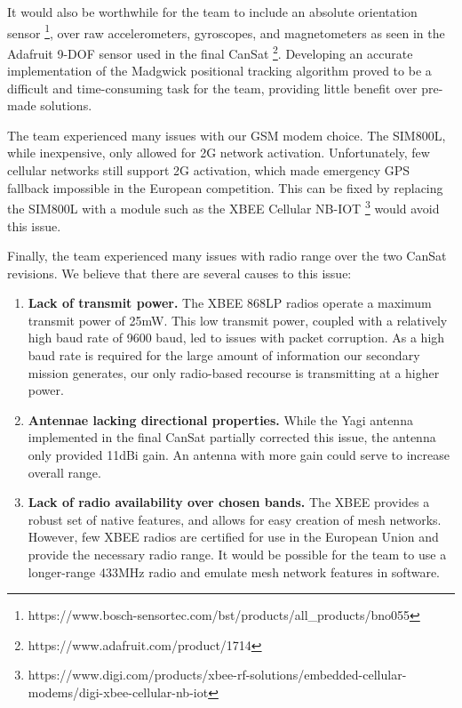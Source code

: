 \documentclass[]{report}
\begin{document}
	It would also be worthwhile for the team to include an absolute orientation sensor \footnote{https://www.bosch-sensortec.com/bst/products/all\_products/bno055}, over raw accelerometers, gyroscopes, and magnetometers as seen in the Adafruit 9-DOF sensor used in the final CanSat \footnote{https://www.adafruit.com/product/1714}. Developing an accurate implementation of the Madgwick positional tracking algorithm proved to be a difficult and time-consuming task for the team, providing little benefit over pre-made solutions.
	
	The team experienced many issues with our GSM modem choice. The SIM800L, while inexpensive, only allowed for 2G network activation. Unfortunately, few cellular networks still support 2G activation, which made emergency GPS fallback impossible in the European competition. This can be fixed by replacing the SIM800L with a module such as the XBEE Cellular NB-IOT \footnote{https://www.digi.com/products/xbee-rf-solutions/embedded-cellular-modems/digi-xbee-cellular-nb-iot} would avoid this issue.
	
	Finally, the team experienced many issues with radio range over the two CanSat revisions. We believe that there are several causes to this issue:
	
	\begin{enumerate}
		\item \textbf{Lack of transmit power.} The XBEE 868LP radios operate a maximum transmit power of 25mW. This low transmit power, coupled with a relatively high baud rate of 9600 baud, led to issues with packet corruption. As a high baud rate is required for the large amount of information our secondary mission generates, our only radio-based recourse is transmitting at a higher power. \\
		\item \textbf{Antennae lacking directional properties.} While the Yagi antenna implemented in the final CanSat partially corrected this issue, the antenna only provided 11dBi gain. An antenna with more gain could serve to increase overall range. \\
		\item \textbf{Lack of radio availability over chosen bands.} The XBEE provides a robust set of native features, and allows for easy creation of mesh networks. However, few XBEE radios are certified for use in the European Union and provide the necessary radio range. It would be possible for the team to use a longer-range 433MHz radio and emulate mesh network features in software.
	\end{enumerate}
	
\end{document}
